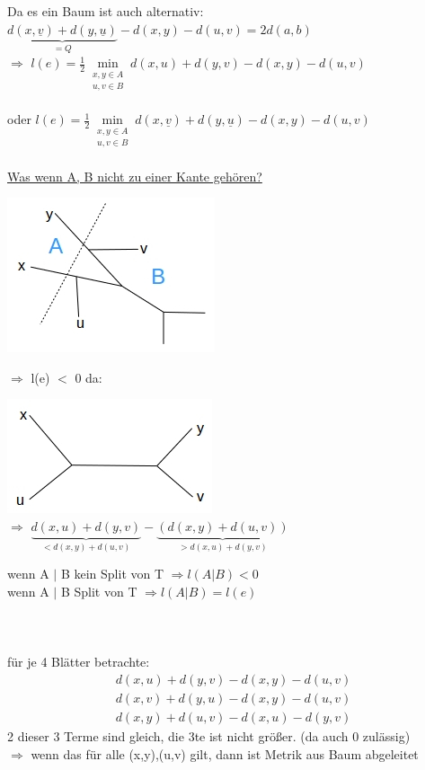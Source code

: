 Da es ein Baum ist auch alternativ:
$\underbrace{d(x,\underline{v}) + d(y,\underline{u})}_{=Q} - d(x,y) - d(u,v) = 2d(a,b)$\\
$\Rightarrow$ $l(e) = \frac{1}{2} \min \limits_{\substack{x,y \in A\\ u,v \in B}} d(x,u) + d(y,v) - d(x,y) - d(u,v)$\\\\
oder $l(e) = \frac{1}{2} \min \limits_{\substack{x,y \in A\\ u,v \in B}} d(x,\underline{v}) + d(y,\underline{u}) - d(x,y) - d(u,v)$
\\\\
\underline{Was wenn A, B nicht zu einer Kante gehören?}
\begin{center}
	\includegraphics[scale=1]{lectures/161209/pix/pic7.jpg}
\end{center}
$\Rightarrow$ l(e) $<$ 0 da:
\begin{center}
	\includegraphics[scale=1]{lectures/161209/pix/pic8.jpg}\\
	$\Rightarrow$ $\underbrace{d(x,u) + d(y,v)}_{<d(x,y) + d(u,v)} - \underbrace{(d(x,y) + d(u,v))}_{>d(x,u) + d(y,v)}$
\end{center}

wenn A $|$ B kein Split von T $\Rightarrow l(A|B) < 0$\\
wenn A $|$ B Split von T $\Rightarrow l(A|B) = l(e)$ 
\\\\
\\\\
für je 4 Blätter betrachte:\\
\begin{align*}
 	d(x,u) + d(y,v) - d(x,y) - d(u,v)\\
 	d(x,v) + d(y,u) - d(x,y) - d(u,v)\\
 	d(x,y) + d(u,v) - d(x,u) - d(y,v)
\end{align*}
2 dieser 3 Terme sind gleich, die 3te ist nicht größer. (da auch 0 zulässig)\\
$\Rightarrow$ wenn das für alle (x,y),(u,v) gilt, dann ist Metrik aus Baum abgeleitet

